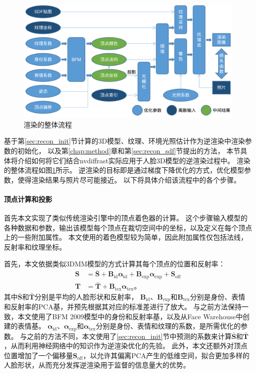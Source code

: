 \begin{figure}
\centering
\includegraphics[width=\linewidth]{figures/recon_render}
\caption{渲染的整体流程}
\label{fig:recon_render}
\end{figure}

基于第\ref{sec:recon_init}节计算的3D模型、纹理、环境光照估计作为逆渲染中渲染参数的初始化，
以及第\ref{chap:method}章和第\ref{sec:recon_sdf}节提出的方法，
本节具体将介绍如何将它们结合nvdiffrast\citep{nvdiffrast}实际应用于人脸3D模型的逆渲染过程中。
渲染的整体流程如图\ref{fig:recon_render}所示。
逆渲染的目标即是通过梯度下降优化的方式，优化模型参数，使得渲染结果与照片尽可能接近。
以下将具体介绍该流程中的各个步骤。

\paragraph{顶点计算和投影}
首先本文实现了类似传统渲染引擎中的顶点着色器的计算。
这个步骤输入模型的各种数据和参数，输出该模型每个顶点在裁切空间中的坐标，以及定义在每个顶点上的一些附加属性。
本文使用的着色模型较为简单，因此附加属性仅包括法线，反射率和纹理坐标。

首先，本文依据类似3DMM模型的方式计算其每个顶点的位置和反射率：
\begin{align}
\mathbf{S} &= \bar{\mathbf{S}} +
\mathbf{B}_\mathrm{id}\mathbf{\alpha}_\mathrm{id} +
\mathbf{B}_\mathrm{exp}\mathbf{\alpha}_\mathrm{exp} +
\mathbf{S}_\mathrm{off}\\
\mathbf{T} &= \bar{\mathbf{T}} +
\mathbf{B}_\mathrm{tex}\mathbf{\alpha}_\mathrm{tex}
\text{。}
\end{align}
其中$\bar{\mathbf{S}}$和$\bar{\mathbf{T}}$分别是平均的人脸形状和反射率，
$\mathbf{B}_\mathrm{id}$、$\mathbf{B}_\mathrm{exp}$和$\mathbf{B}_\mathrm{tex}$分别是身份、表情和反射率的PCA基，并预先根据其对应的标准差进行了放大。
与之前方法\citep{deep3d,GuoZCJZ19}保持一致，本文使用了BFM 2009模型\citep{BFM}中的身份和反射率基，以及从Face Warehouse\citep{FaceWarehouse}中创建的表情基。
$\mathbf{\alpha}_\mathrm{id}$、$\mathbf{\alpha}_\mathrm{exp}$和$\mathbf{\alpha}_\mathrm{tex}$分别是身份、表情和纹理的系数，是所需优化的参数。
与之前的方法不同，本文使用了\ref{sec:recon_init}节中预测的系数来计算$\bar{\mathbf{S}}$和$\bar{\mathbf{T}}$，从而利用神经网络中的知识作为逆渲染优化的先验。
此外，本文还额外对顶点位置增加了一个偏移量$\mathbf{S}_\mathrm{off}$，以允许其偏离PCA产生的低维空间，拟合更加多样的人脸形状，从而充分发挥逆渲染用于监督的信息量大的优势。

